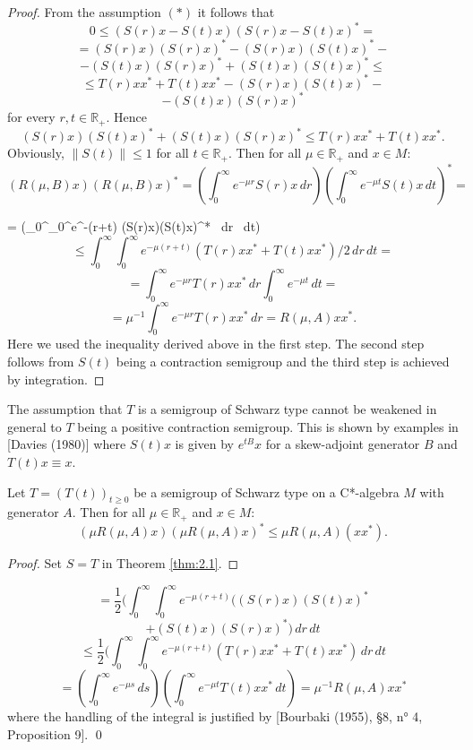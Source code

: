 \begin{proof}
From the assumption $ (*) $ it follows that
\[
0 \leq (S(r)x - S(t)x)(S(r)x - S(t)x)^* =
\]
\[
= (S(r)x)(S(r)x)^* - (S(r)x)(S(t)x)^* -
\]
\[
- (S(t)x)(S(r)x)^* + (S(t)x)(S(t)x)^* \leq
\]
\[
\leq T(r)xx^* + T(t)xx^* - (S(r)x)(S(t)x)^* -
\]
\[
- (S(t)x)(S(r)x)^*
\]
for every $ r,t \in \mathbb{R}_+ $.
Hence
\[
(S(r)x)(S(t)x)^* + (S(t)x)(S(r)x)^* \leq T(r)xx^* + T(t)xx^*.
\]
Obviously, $ \|S(t)\| \leq 1 $ for all $ t \in \mathbb{R}_+ $.
Then for all $ \mu \in \mathbb{R}_+ $ and $ x \in M $:
\[
(R(\mu,B)x)(R(\mu,B)x)^* = (\int_0^\infty e^{-\mu r}S(r)x \, dr)(\int_0^\infty e^{-\mu t}S(t)x \, dt)^* =
\]

= (\int_0^\infty \int_0^\infty e^{-\mu(r+t)} (S(r)x)(S(t)x)^* \, dr \, dt) \leq
\]
\[
\leq \int_0^\infty \int_0^\infty e^{-\mu(r+t)} (T(r)xx^* + T(t)xx^*)/2 \, dr \, dt =
\]
\[
= \int_0^\infty e^{-\mu r} T(r)xx^* \, dr \int_0^\infty e^{-\mu t} \, dt =
\]
\[
= \mu^{-1} \int_0^\infty e^{-\mu r} T(r)xx^* \, dr = R(\mu,A)xx^*.
\]
Here we used the inequality derived above in the first step.
The second step follows from $ S(t)$ being a contraction semigroup and the third step is achieved by integration.
\end{proof}

\begin{remark}
The assumption that $ T $ is a semigroup of Schwarz type cannot be weakened in general to $ T $ being a positive contraction semigroup.
This is shown by examples in [Davies (1980)] where $ S(t)x $ is given by $ e^{tB}x $ for a skew-adjoint generator $ B $ and $ T(t)x \equiv x $.
\end{remark}

\begin{corollary}\label{cor:2.2}
Let $ T = (T(t))_{t\geq0} $ be a semigroup of Schwarz type on a C*-algebra $ M $ with generator $ A $.
Then for all $ \mu \in \mathbb{R}_+ $ and $ x \in M $:
\[
(\mu R(\mu,A)x)(\mu R(\mu,A)x)^* \leq \mu R(\mu,A)(xx^*).
\]
\end{corollary}

\begin{proof}
Set $ S = T $ in Theorem \ref{thm:2.1}.
\end{proof}


\[
= \frac{1}{2}(\int_0^\infty \int_0^\infty e^{-\mu(r+t)} ((S(r)x)(S(t)x)^*
\]
\[
+ (S(t)x)(S(r)x)^*) \, dr \, dt
\]
\[
\leq \frac{1}{2}(\int_0^\infty \int_0^\infty e^{-\mu(r+t)} (T(r)xx^* + T(t)xx^*) \, dr \, dt
\]
\[
= (\int_0^\infty e^{-\mu s} \, ds)(\int_0^\infty e^{-\mu t}T(t)xx^* \, dt) = \mu^{-1}R(\mu,A)xx^*
\]
where the handling of the integral is justified by [Bourbaki (1955), §8, n° 4, Proposition 9].
\qed

